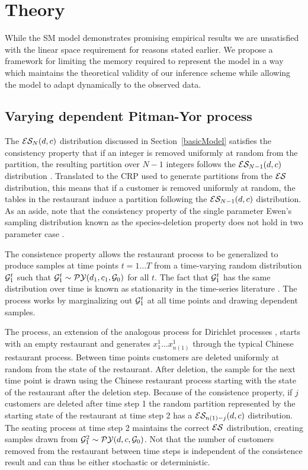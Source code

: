 \section{Theory}

While the SM model demonstrates promising empirical results \cite{Gasthaus} we are unsatisfied with the linear space requirement for reasons stated earlier.  We propose a framework for limiting the memory required to represent the model in a way which maintains the theoretical validity of our inference scheme while allowing the model to adapt dynamically to the observed data.

\subsection{Varying dependent Pitman-Yor process \cite{caron}} 

The $\ES_N(d,c)$ distribution discussed in Section~\ref{basicModel} satisfies the consistency property that if an integer is removed uniformly at random from the partition, the resulting partition over $N-1$ integers follows the $\ES_{N-1}(d,c)$ distribution \cite{pitman}.  Translated to the CRP used to generate partitions from the $\ES$ distribution, this means that if a customer is removed uniformly at random, the tables in the restaurant induce a partition following the $\ES_{N-1}(d,c)$ distribution. As an aside, note that the consistency property of the single parameter Ewen's sampling distribution known as the species-deletion property \cite{kingman} does not hold in two parameter case \cite{pitman}.

The consistence property allows the restaurant process to be generalized to produce samples at time points $t = 1 \dots T$ from a time-varying random distribution $\G^t_1$ such that $\G^t_1 \sim \PY(d_1, c_1, \G_0)$ for all $t$.   The fact that $\G^t_1$ has the same distribution over time is known as stationarity in the time-series literature \cite{davis and brockwel?}.  The process works by marginalizing out $\G^t_1$ at all time points and drawing dependent samples.

The process, an extension of the analogous process for Dirichlet processes \cite{caron}, starts with an empty restaurant and generates $x^1_1 \dots x^1_{n(1)}$ through the typical Chinese restaurant process.  Between time points customers are deleted uniformly at random from the state of the restaurant.  After deletion, the sample for the next time point is drawn using the Chinese restaurant process starting with the state of the restaurant after the deletion step.  Because of the consistence property, if $j$ customers are deleted after time step 1 the random partition represented by the starting state of the restaurant at time step 2 has a $\ES_{n(1) - j}(d,c)$ distribution.  The seating process at time step 2 maintains the correct $\ES$ distribution, creating samples drawn from $\G^2_1 \sim \PY(d,c,\G_0)$.  Not that the number of customers removed from the restaurant between time steps is independent of the consistence result and can thus be either stochastic or deterministic.

